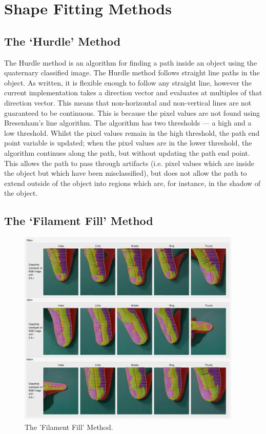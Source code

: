 \chapter{Shape Fitting Methods}

\section{The `Hurdle' Method}\label{sec:HurdleMethod}
The Hurdle method is an algorithm for finding a path inside an object using the quaternary classified image. The Hurdle method follows straight line paths in the object. As written, it is flexible enough to follow any straight line, however the current implementation takes a direction vector and evaluates at multiples of that direction vector. This means that non-horizontal and non-vertical lines are not guaranteed to be continuous. This is because the pixel values are not found using Bresenham's line algorithm. The algorithm has two thresholds --- a high and a low threshold. Whilst the pixel values remain in the high threshold, the path end point variable is updated; when the pixel values are in the lower threshold, the algorithm continues along the path, but without updating the path end point. This allows the path to pass through artifacts (i.e. pixel values which are inside the object but which have been misclassified), but does not allow the path to extend outside of the object into regions which are, for instance, in the shadow of the object.
 
\section{The `Filament Fill' Method}\label{sec:FilamentFill}

\begin{figure}[h!]
  \centering
    \includegraphics[width=0.95\textwidth]{Chapter4/Figs/FillamentFill.jpg}
    \caption{The 'Filament Fill' Method.}\label{fig:FillamentFill}
\end{figure}

